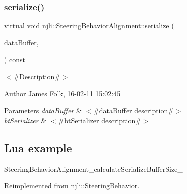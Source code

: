 \mbox{\label{classnjli_1_1_steering_behavior_alignment_abdbf23a5b3b54642be4ff30ff0e3edca}} 
\subsubsection{\texorpdfstring{serialize()}{serialize()}}
{\footnotesize\ttfamily virtual \mbox{\hyperlink{_thread_8h_af1e856da2e658414cb2456cb6f7ebc66}{void}} njli\+::\+Steering\+Behavior\+Alignment\+::serialize (\begin{DoxyParamCaption}\item[{\mbox{\hyperlink{_thread_8h_af1e856da2e658414cb2456cb6f7ebc66}{void}} $\ast$}]{data\+Buffer,  }\item[{bt\+Serializer $\ast$}]{ }\end{DoxyParamCaption}) const\hspace{0.3cm}{\ttfamily [virtual]}}



$<$\#\+Description\#$>$ 

\begin{DoxyAuthor}{Author}
James Folk, 16-\/02-\/11 15\+:02\+:45
\end{DoxyAuthor}

\begin{DoxyParams}{Parameters}
{\em data\+Buffer} & $<$\#data\+Buffer description\#$>$ \\
\hline
{\em bt\+Serializer} & $<$\#bt\+Serializer description\#$>$\\
\hline
\end{DoxyParams}
\hypertarget{classnjli_1_1_steering_behavior_wander_ex1}{}\subsection{Lua example}\label{classnjli_1_1_steering_behavior_wander_ex1}

\begin{DoxyCodeInclude}
\end{DoxyCodeInclude}
Steering\+Behavior\+Alignment\+\_\+calculate\+Serialize\+Buffer\+Size\+\_\+ 

Reimplemented from \mbox{\hyperlink{classnjli_1_1_steering_behavior_aa8494cb4a327c0040f64cfe8b393786e}{njli\+::\+Steering\+Behavior}}.

